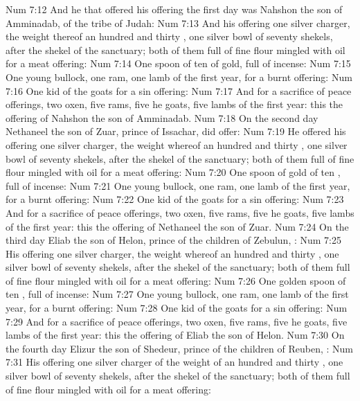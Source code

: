 \vs Num 7:12 And he that offered his offering the first day was Nahshon the son of Amminadab, of the tribe of Judah:
\vs Num 7:13 And his offering  one silver charger, the weight thereof  an hundred and thirty , one silver bowl of seventy shekels, after the shekel of the sanctuary; both of them  full of fine flour mingled with oil for a meat offering:
\vs Num 7:14 One spoon of ten  of gold, full of incense:
\vs Num 7:15 One young bullock, one ram, one lamb of the first year, for a burnt offering:
\vs Num 7:16 One kid of the goats for a sin offering:
\vs Num 7:17 And for a sacrifice of peace offerings, two oxen, five rams, five he goats, five lambs of the first year: this  the offering of Nahshon the son of Amminadab.
\vs Num 7:18 On the second day Nethaneel the son of Zuar, prince of Issachar, did offer:
\vs Num 7:19 He offered  his offering one silver charger, the weight whereof  an hundred and thirty , one silver bowl of seventy shekels, after the shekel of the sanctuary; both of them full of fine flour mingled with oil for a meat offering:
\vs Num 7:20 One spoon of gold of ten , full of incense:
\vs Num 7:21 One young bullock, one ram, one lamb of the first year, for a burnt offering:
\vs Num 7:22 One kid of the goats for a sin offering:
\vs Num 7:23 And for a sacrifice of peace offerings, two oxen, five rams, five he goats, five lambs of the first year: this  the offering of Nethaneel the son of Zuar.
\vs Num 7:24 On the third day Eliab the son of Helon, prince of the children of Zebulun, :
\vs Num 7:25 His offering  one silver charger, the weight whereof  an hundred and thirty , one silver bowl of seventy shekels, after the shekel of the sanctuary; both of them full of fine flour mingled with oil for a meat offering:
\vs Num 7:26 One golden spoon of ten , full of incense:
\vs Num 7:27 One young bullock, one ram, one lamb of the first year, for a burnt offering:
\vs Num 7:28 One kid of the goats for a sin offering:
\vs Num 7:29 And for a sacrifice of peace offerings, two oxen, five rams, five he goats, five lambs of the first year: this  the offering of Eliab the son of Helon.
\vs Num 7:30 On the fourth day Elizur the son of Shedeur, prince of the children of Reuben, :
\vs Num 7:31 His offering  one silver charger of the weight of an hundred and thirty , one silver bowl of seventy shekels, after the shekel of the sanctuary; both of them full of fine flour mingled with oil for a meat offering:
